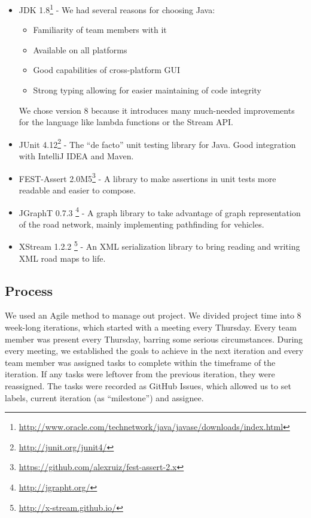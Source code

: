 \documentclass[a4paper,12pt]{article}
\begin{document}
\begin{itemize}
	\item JDK 1.8\footnote{\url{http://www.oracle.com/technetwork/java/javase/downloads/index.html}} - We had several reasons for choosing Java: \begin{itemize}
		\item Familiarity of team members with it
		\item Available on all platforms
		\item Good capabilities of cross-platform GUI
		\item Strong typing allowing for easier maintaining of code integrity
	\end{itemize}
	We chose version 8 because it introduces many much-needed improvements for the language like lambda functions or the Stream API.
	\item JUnit 4.12\footnote{\url{http://junit.org/junit4/}} - The ``de facto'' unit testing library for Java. Good integration with IntelliJ IDEA and Maven.
	\item FEST-Assert 2.0M5\footnote{\url{https://github.com/alexruiz/fest-assert-2.x}} - A library to make assertions in unit tests more readable and easier to compose.
	\item JGraphT 0.7.3 \footnote{\url{http://jgrapht.org/}} - A graph library to take advantage of graph representation of the road network, mainly implementing pathfinding for vehicles.
	\item XStream 1.2.2 \footnote{\url{http://x-stream.github.io/}} - An XML serialization library to bring reading and writing XML road maps to life.
\end{itemize}

\subsection{Process}
We used an Agile method to manage out project. We divided project time into 8 week-long iterations, which started with a meeting every Thursday. Every team member was present every Thursday, barring some serious circumstances. During every meeting, we established the goals to achieve in the next iteration and every team member was assigned tasks to complete within the timeframe of the iteration. If any tasks were leftover from the previous iteration, they were reassigned. The tasks were recorded as GitHub Issues, which allowed us to set labels, current iteration (as ``milestone'') and assignee.
\end{document}
